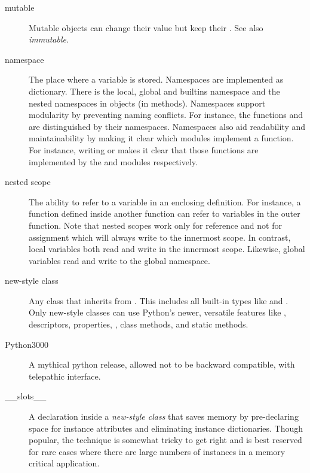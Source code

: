 \begin{description}
\item[mutable]
Mutable objects can change their value but keep their .
See also \emph{immutable}.

\item[namespace]
The place where a variable is stored.  Namespaces are implemented as
dictionary.  There is the local, global and builtins namespace and the
nested namespaces in objects (in methods).  Namespaces support
modularity by preventing naming conflicts.  For instance, the
functions  and  are
distinguished by their namespaces.  Namespaces also aid readability
and maintainability by making it clear which modules implement a
function.  For instance, writing  or
{} makes it clear that those functions are
implemented by the 
and  modules
respectively.

\item[nested scope]
The ability to refer to a variable in an enclosing definition.  For
instance, a function defined inside another function can refer to
variables in the outer function.  Note that nested scopes work only
for reference and not for assignment which will always write to the
innermost scope.  In contrast, local variables both read and write in
the innermost scope.  Likewise, global variables read and write to the
global namespace.

\item[new-style class]
Any class that inherits from .  This includes all
built-in types like  and .  Only new-style
classes can use Python's newer, versatile features like
{}, descriptors, properties,
, class methods, and static methods.

\item[Python3000]
A mythical python release, allowed not to be backward compatible, with
telepathic interface.

\item[__slots__]
A declaration inside a \emph{new-style class} that saves memory by
pre-declaring space for instance attributes and eliminating instance
dictionaries.  Though popular, the technique is somewhat tricky to get
right and is best reserved for rare cases where there are large
numbers of instances in a memory critical application.


\end{description}
